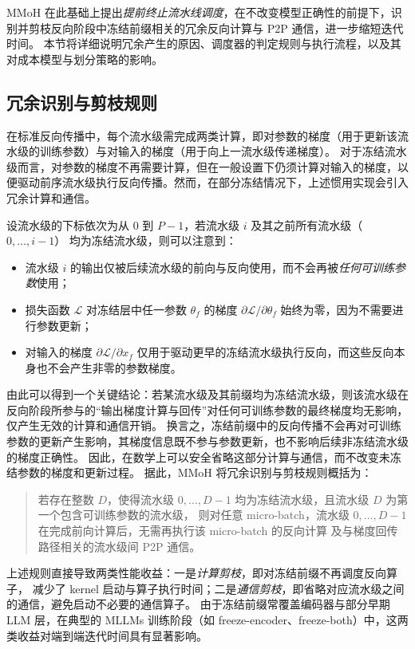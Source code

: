 MMoH 在此基础上提出\emph{提前终止流水线调度}，在不改变模型正确性的前提下，识别并剪枝反向阶段中冻结前缀相关的冗余反向计算与 P2P 通信，进一步缩短迭代时间。
本节将详细说明冗余产生的原因、调度器的判定规则与执行流程，以及其对成本模型与划分策略的影响。

\subsection{冗余识别与剪枝规则}

在标准反向传播中，每个流水级需完成两类计算，即对参数的梯度（用于更新该流水级的训练参数）与对输入的梯度（用于向上一流水级传递梯度）。
对于冻结流水级而言，对参数的梯度不再需要计算，但在一般设置下仍须计算对输入的梯度，以便驱动前序流水级执行反向传播。然而，在部分冻结情况下，上述惯用实现会引入冗余计算和通信。

设流水级的下标依次为从 $0$ 到 $P-1$，若流水级 $i$ 及其之前所有流水级（$0, \ldots, i-1$）
均为冻结流水级，则可以注意到：

\begin{itemize}
  \item 流水级 $i$ 的输出仅被后续流水级的前向与反向使用，而不会再被\emph{任何可训练参数}使用；
  \item 损失函数 $\mathcal{L}$ 对冻结层中任一参数 $\theta_f$ 的梯度 $\partial \mathcal{L}/\partial \theta_f$ 始终为零，因为不需要进行参数更新；
  \item 对输入的梯度 $\partial \mathcal{L}/\partial x_f$ 仅用于驱动更早的冻结流水级执行反向，而这些反向本身也不会产生非零的参数梯度。
\end{itemize}

由此可以得到一个关键结论：若某流水级及其前缀均为冻结流水级，则该流水级在反向阶段所参与的“输出梯度计算与回传”对任何可训练参数的最终梯度均无影响，仅产生无效的计算和通信开销。
换言之，冻结前缀中的反向传播不会再对可训练参数的更新产生影响，其梯度信息既不参与参数更新，也不影响后续非冻结流水级的梯度正确性。
因此，在数学上可以安全省略这部分计算与通信，而不改变未冻结参数的梯度和更新过程。
据此，MMoH 将冗余识别与剪枝规则概括为：

\begin{quote}
  若存在整数 $D$，使得流水级 $0, \ldots, D-1$ 均为冻结流水级，且流水级 $D$ 为第一个包含可训练参数的流水级，
  则对任意 micro-batch，流水级 $0, \ldots, D-1$ 在完成前向计算后，无需再执行该 micro-batch 的反向计算
  及与梯度回传路径相关的流水级间 P2P 通信。
\end{quote}

上述规则直接导致两类性能收益：一是\emph{计算剪枝}，即对冻结前缀不再调度反向算子，
减少了 kernel 启动与算子执行时间；二是\emph{通信剪枝}，即省略对应流水级之间的通信，避免启动不必要的通信算子。
由于冻结前缀常覆盖编码器与部分早期 LLM 层，在典型的 MLLMs 训练阶段（如 freeze-encoder、freeze-both）中，这两类收益对端到端迭代时间具有显著影响。


